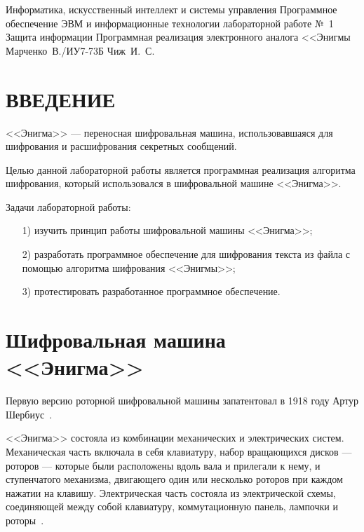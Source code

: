 \documentclass{bmstu}
\begin{document}
\makereporttitle
    {Информатика, искусственный интеллект и системы управления} %
    {Программное обеспечение ЭВМ и информационные технологии} %
    {лабораторной работе №~1} %
    {Защита информации} %
    {Программная реализация электронного аналога <<Энигмы} %
    {} %
    {Марченко~В./ИУ7-73Б} %
    {Чиж~И.~С.} %

{\centering \maketableofcontents}

{\centering \chapter*{ВВЕДЕНИЕ}}

<<Энигма>> --- переносная шифровальная машина, использовавшаяся для шифрования и расшифрования секретных сообщений. 

Целью данной лабораторной работы является программная реализация алгоритма шифрования, который использовался в шифровальной машине <<Энигма>>.

Задачи лабораторной работы:
\begin{enumerate}
\item[1)] изучить принцип работы шифровальной машины <<Энигма>>;
\item[2)] разработать программное обеспечение для шифрования текста из файла с помощью алгоритма шифрования <<Энигмы>>;
\item[3)] протестировать разработанное программное обеспечение.
\end{enumerate}

\chapter{Шифровальная машина <<Энигма>>}

Первую версию роторной шифровальной машины запатентовал в 1918 году Артур Шербиус~\cite{wiki}.

<<Энигма>> состояла из комбинации механических и электрических систем. 
Механическая часть включала в себя клавиатуру, набор вращающихся дисков --- роторов --- которые были расположены вдоль вала и прилегали к нему, и ступенчатого механизма, двигающего один или несколько роторов при каждом нажатии на клавишу. 
Электрическая часть состояла из электрической схемы, соединяющей между собой клавиатуру, коммутационную панель, лампочки и роторы~\cite{wiki}.
\end{document}
